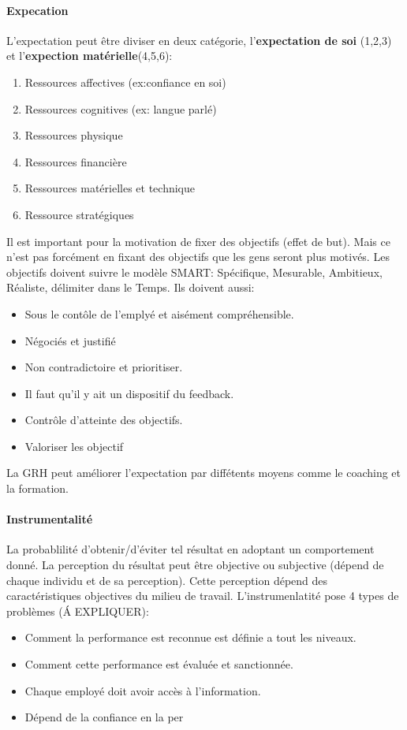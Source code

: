 \documentclass[11pt]{article} %
\begin{document}
		\paragraph{Expecation} L'expectation peut être diviser en deux catégorie, l'\textbf{expectation de soi}
		(1,2,3) et l'\textbf{expection matérielle}(4,5,6):
		\begin{multicols}{2}
			\begin{enumerate}
				\item Ressources affectives (ex:confiance en soi)
				\item Ressources cognitives (ex: langue parlé)
				\item Ressources physique
				\item Ressources financière
				\item Ressources matérielles et technique
				\item Ressource stratégiques
			\end{enumerate}
		\end{multicols}
		Il est important pour la motivation de fixer des objectifs (effet de but). Mais ce n'est pas forcément en 
		fixant des objectifs que les gens seront plus motivés. Les objectifs doivent suivre le modèle SMART:
		 Spécifique, Mesurable, Ambitieux, Réaliste, délimiter dans le Temps. Ils doivent aussi:
		 \begin{multicols}{2}
		 	\begin{itemize}
		 		\item Sous le contôle de l'emplyé et aisément compréhensible.
		 		\item Négociés et justifié
		 		\item Non contradictoire et prioritiser.
		 		\item Il faut qu'il y ait un dispositif du feedback.
		 		\item Contrôle d'atteinte des objectifs.
		 		\item Valoriser les objectif
		 	\end{itemize}
		 \end{multicols}
		 La GRH peut améliorer l'expectation par diffétents moyens comme le coaching et la formation.
		 
		 \paragraph{Instrumentalité} La probablilité d'obtenir/d'éviter tel résultat en adoptant un
		 comportement donné. La perception du résultat peut être objective ou subjective (dépend de chaque 
		 individu et de sa perception). Cette perception dépend des caractéristiques objectives du milieu de 
		 travail.
		 L'instrumenlatité pose 4 types de problèmes (Á EXPLIQUER):
		 \begin{itemize}
		 	\item Comment la performance est reconnue est définie a tout les niveaux.
		 	\item Comment cette performance est évaluée et sanctionnée.
		 	\item Chaque employé doit avoir accès à l'information.
		 	\item Dépend de la confiance en la per
		 \end{itemize}
\end{document}
